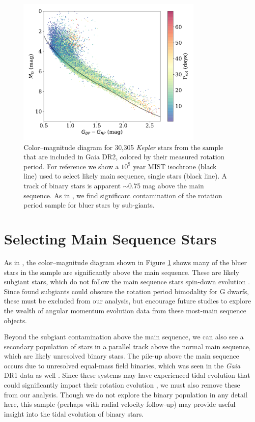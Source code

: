 \documentclass[preprint2]{aastex62}
\newcommand{\Kepler}{\textsl{Kepler}\xspace}
\begin{document}
\begin{figure}[]
\centering
\includegraphics[width=3.6in]{../figures/cmd}
\caption{
Color--magnitude diagram for 30,305 \Kepler stars from the \citet{mcquillan2014} sample that are included in Gaia DR2, colored by their measured rotation period. For reference we show a $10^9$ year MIST isochrone (black line) used to select likely main sequence, single stars (black line). A track of binary  stars is apparent $\sim$0.75 mag above the main sequence. As in \citet{davenport2017}, we find significant contamination of the rotation period sample for bluer stars by sub-giants.}
\label{fig:cmd}
\end{figure}




\section{Selecting Main Sequence Stars}

As in \citet{davenport2017}, the color--magnitude diagram shown in Figure \ref{fig:cmd} shows many of the bluer stars in the \citet{mcquillan2014} sample are significantly above the main sequence. These are likely subgiant stars, which do not follow the main sequence stars spin-down evolution \citep[e.g.][]{donascimento2012, van-saders2013}. Since \citet{davenport2017} found subgiants could obscure the rotation period bimodality for G dwarfs, these must be excluded from our analysis, but encourage future studies to explore the wealth of angular momentum evolution data from these most-main sequence objects.

Beyond the subgiant contamination above the main sequence, we can also see a secondary population of stars in a parallel track above the normal main sequence, which are likely unresolved binary stars. The pile-up above the main sequence occurs due to unresolved equal-mass field binaries, which was seen in the {\em Gaia} DR1 data as well \citep{anderson2017}. Since these systems may have experienced tidal evolution that could significantly impact their rotation evolution \citep[e.g.][]{lurie2017}, we must also remove these from our analysis. Though we do not explore the binary population in any detail here, this sample (perhaps with radial velocity follow-up) may provide useful insight into the tidal evolution of binary stars.
\end{document}
